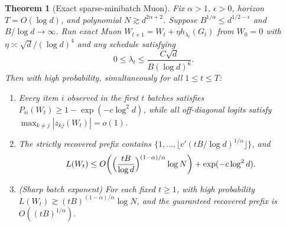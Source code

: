 \documentclass[11pt]{article}
\theoremstyle{plain}
\newtheorem{theorem}{Theorem}
\theoremstyle{definition}
\theoremstyle{remark}
\begin{document}
\begin{theorem}[Exact sparse-minibatch Muon]\label{thm:sparse}
Fix $\alpha > 1$, $\epsilon > 0$, horizon $T = O(\log d)$, and polynomial $N \gtrsim d^{2\alpha+2}$.
Suppose $B^{1/\alpha} \le d^{1/2-\epsilon}$ and $B/\log d \to \infty$.
Run exact Muon $W_{t+1} = W_t + \eta h_{\lambda_t}(G_t)$ from $W_0 = 0$ with $\eta \asymp \sqrt{d}/(\log d)^4$ and any schedule satisfying
\[
0 \le \lambda_t \le \frac{C\sqrt{d}}{B(\log d)^6}.
\]
Then with high probability, simultaneously for all $1 \le t \le T$:
\begin{enumerate}[label=\textup{(\arabic*)}]
\item Every item $i$ observed in the first $t$ batches satisfies $P_{ii}(W_t) \ge 1 - \exp(-c\log^2 d)$, while all off-diagonal logits satisfy $\max_{k \neq j} |z_{kj}(W_t)| = o(1)$.
\item The strictly recovered prefix contains $\{1, \dots, \lfloor c'(tB/\log d)^{1/\alpha}\rfloor\}$, and
\[
L(W_t) \le O\!\left(\Bigl(\frac{tB}{\log d}\Bigr)^{(1-\alpha)/\alpha}\log N\right) + \exp(-c\log^2 d).
\]
\item \emph{(Sharp batch exponent)} For each fixed $t \ge 1$, with high probability $L(W_t) \gtrsim (tB)^{(1-\alpha)/\alpha}\log N$, and the guaranteed recovered prefix is $O((tB)^{1/\alpha})$.
\end{enumerate}
\end{theorem}
\end{document}
